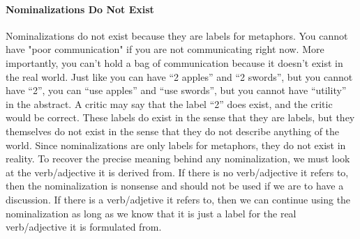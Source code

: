 \documentclass[a4paper, 12pt]{article}
\begin{document}
\paragraph{Nominalizations Do Not Exist}
Nominalizations do not exist because they are labels for metaphors. You cannot have "poor communication" if you are not communicating right now. More importantly, you can't hold a bag of communication because it doesn't exist in the real world. Just like you can have ``2 apples'' and ``2 swords'', but you cannot have ``2'', you can ``use apples'' and ``use swords'', but you cannot have ``utility'' in the abstract. A critic may say that the label ``2'' does exist, and the critic would be correct. These labels do exist in the sense that they are labels, but they themselves do not exist in the sense that they do not describe anything of the world. Since nominalizations are only labels for metaphors, they do not exist in reality. To recover the precise meaning behind any nominalization, we must look at the verb/adjective it is derived from. If there is no verb/adjective it refers to, then the nominalization is nonsense and should not be used if we are to have a discussion. If there is a verb/adjetive it refers to, then we can continue using the nominalization as long as we know that it is just a label for the real verb/adjective it is formulated from.
\end{document}
